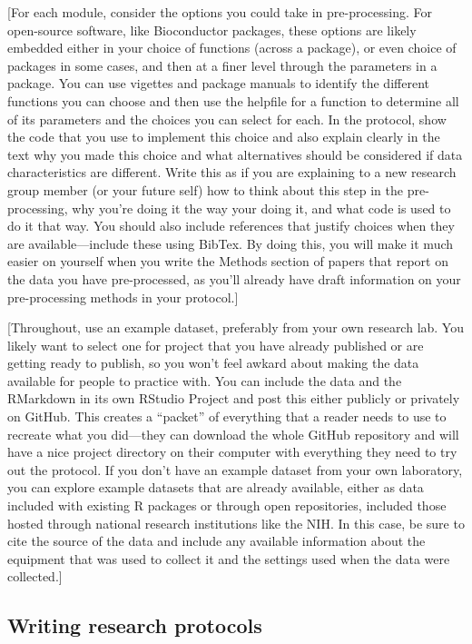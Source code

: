 \documentclass[]{tufte-book}
\begin{document}
{[}For each module, consider the options you could take in pre-processing. For
open-source software, like Bioconductor packages, these options are likely
embedded either in your choice of functions (across a package), or even choice
of packages in some cases, and then at a finer level through the parameters in a
package. You can use vigettes and package manuals to identify the different
functions you can choose and then use the helpfile for a function to determine
all of its parameters and the choices you can select for each. In the protocol,
show the code that you use to implement this choice and also explain clearly in
the text why you made this choice and what alternatives should be considered if
data characteristics are different. Write this as if you are explaining to a new
research group member (or your future self) how to think about this step in the
pre-processing, why you're doing it the way your doing it, and what code is used
to do it that way. You should also include references that justify choices when
they are available---include these using BibTex. By doing this, you will make it
much easier on yourself when you write the Methods section of papers that report
on the data you have pre-processed, as you'll already have draft information on
your pre-processing methods in your protocol.{]}

{[}Throughout, use an example dataset, preferably from your own research lab. You
likely want to select one for project that you have already published or are
getting ready to publish, so you won't feel awkard about making the data
available for people to practice with. You can include the data and the
RMarkdown in its own RStudio Project and post this either publicly or privately
on GitHub. This creates a ``packet'' of everything that a reader needs to use to
recreate what you did---they can download the whole GitHub repository and will
have a nice project directory on their computer with everything they need to try
out the protocol. If you don't have an example dataset from your own laboratory,
you can explore example datasets that are already available, either as data
included with existing R packages or through open repositories, included those
hosted through national research institutions like the NIH. In this case, be
sure to cite the source of the data and include any available information about
the equipment that was used to collect it and the settings used when the data
were collected.{]}

\hypertarget{writing-research-protocols}{%
\subsection{Writing research protocols}\label{writing-research-protocols}}
\end{document}
